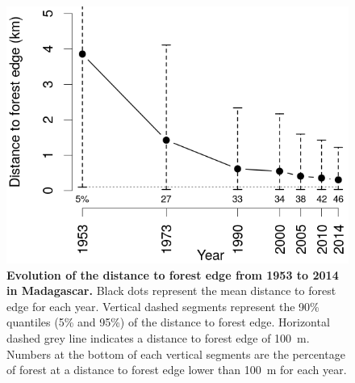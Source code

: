 \documentclass[a4paper, 12pt, leqno]{article} %
\begin{document}
\begin{figure}[h!]
  \centering
  
  \includegraphics[width=12cm]{figs/dist.png}

  \caption{\textbf{Evolution of the distance to forest edge from 1953
      to 2014 in Madagascar.} Black dots represent the mean distance
    to forest edge for each year. Vertical dashed segments represent
    the 90\% quantiles (5\% and 95\%) of the distance to forest
    edge. Horizontal dashed grey line indicates a distance to forest
    edge of 100~m. Numbers at the bottom of each vertical segments are
    the percentage of forest at a distance to forest edge lower than
    100~m for each year.}
  
  \label{fig:dist_edge}

\end{figure}
\end{document}
